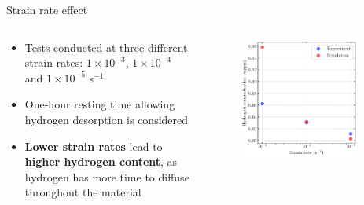 \documentclass[9pt]{beamer}
\begin{document}
\begin{frame}{Strain rate effect}

\begin{columns}

\begin{column}{0.55\textwidth}
\begin{itemize}
	\item Tests conducted at three different strain rates: $1\times10^{-3}$, $1\times10^{-4}$ and $1\times10^{-5}$ s$^{-1}$
	\vspace{0.25cm}
	\item One-hour resting time allowing hydrogen desorption is considered
	\vspace{0.25cm}
	\item \textbf{Lower strain rates} lead to \textbf{higher hydrogen content}, as hydrogen has more time to diffuse throughout the material
\end{itemize}
\end{column}

\begin{column}{0.45\textwidth}
\begin{figure}
	\centering
	\includegraphics[width=0.9\textwidth]{Images/strain_rate_effect.pdf} \\
	\vspace{0.25cm}
\end{figure}


\end{column}
\end{columns}
\end{frame}
\end{document}
